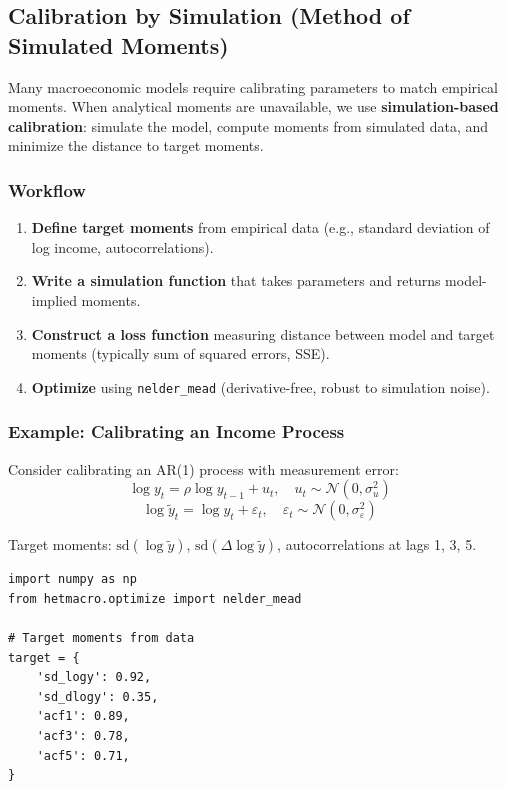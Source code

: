 \documentclass[12pt]{book}
\let\oldtextbf\textbf
\newcommand{\labelpara}[1]{\paragraph{#1}\mbox{}\par\noindent\ignorespaces}
\newcommand{\formatlabel}[1]{%
    \IfStrEq{#1}{Purpose:}{\labelpara{Purpose.}}{%
    \IfStrEq{#1}{Arguments:}{\labelpara{Arguments.}}{%
    \IfStrEq{#1}{Example:}{\labelpara{Example.}}{%
    \IfStrEq{#1}{Workflow:}{\labelpara{Workflow.}}{%
    \IfStrEq{#1}{Algorithm:}{\labelpara{Algorithm.}}{%
    \IfStrEq{#1}{Note:}{\labelpara{Note.}}{%
    \IfStrEq{#1}{When to use:}{\labelpara{When to use.}}{%
    \oldtextbf{#1}}}}}}}}%
}
\renewcommand{\textbf}[1]{\formatlabel{#1}}
\begin{document}
\begin{onehalfspacing}
\subsection{Calibration by Simulation (Method of Simulated Moments)}

Many macroeconomic models require calibrating parameters to match empirical moments. When analytical moments are unavailable, we use \oldtextbf{simulation-based calibration}: simulate the model, compute moments from simulated data, and minimize the distance to target moments.

\subsubsection{Workflow}

\begin{enumerate}
    \item \oldtextbf{Define target moments} from empirical data (e.g., standard deviation of log income, autocorrelations).
    \item \oldtextbf{Write a simulation function} that takes parameters and returns model-implied moments.
    \item \oldtextbf{Construct a loss function} measuring distance between model and target moments (typically sum of squared errors, SSE).
    \item \oldtextbf{Optimize} using \texttt{nelder\_mead} (derivative-free, robust to simulation noise).
\end{enumerate}

\subsubsection{Example: Calibrating an Income Process}

Consider calibrating an AR(1) process with measurement error:
\[
\log y_t = \rho \log y_{t-1} + u_t, \quad u_t \sim \mathcal{N}(0, \sigma_u^2)
\]
\[
\log \tilde{y}_t = \log y_t + \varepsilon_t, \quad \varepsilon_t \sim \mathcal{N}(0, \sigma_\varepsilon^2)
\]

Target moments: $\text{sd}(\log \tilde{y})$, $\text{sd}(\Delta \log \tilde{y})$, autocorrelations at lags 1, 3, 5.

\begin{lstlisting}
import numpy as np
from hetmacro.optimize import nelder_mead

# Target moments from data
target = {
    'sd_logy': 0.92,
    'sd_dlogy': 0.35,
    'acf1': 0.89,
    'acf3': 0.78,
    'acf5': 0.71,
}


\end{lstlisting}
\end{onehalfspacing}
\end{document}
